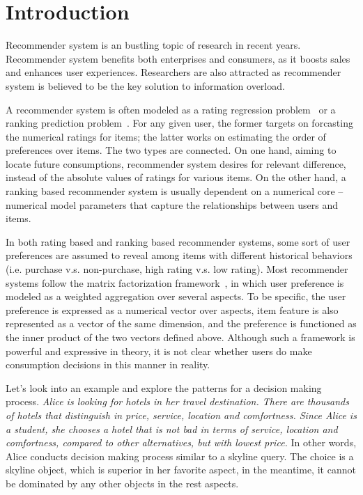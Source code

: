 \documentclass{sig-alternate}
\begin{document}
\section{Introduction}\label{sec:introduction}
Recommender system is an bustling topic of research in recent years. Recommender system benefits both enterprises and consumers, as it boosts sales and enhances user experiences. Researchers are also attracted as recommender system is believed to be the key solution to information overload.   
  
A recommender system is often modeled as a rating regression problem~\cite{Bobadilla2013Recommender} or a ranking prediction problem~\cite{Rendle2009BPR}. For any given user, the former targets on forcasting the numerical ratings for items; the latter works on estimating the order of preferences over items. The two types are connected. On one hand, aiming to locate future consumptions, recommender system desires for relevant difference, instead of the absolute values of ratings for various items. On the other hand, a ranking based recommender system is usually dependent on a numerical core -- numerical model parameters that capture the relationships between users and items.         

In both rating based and ranking based recommender systems, some sort of user preferences are assumed to reveal among items with different historical behaviors (i.e. purchase v.s. non-purchase, high rating v.s. low rating). Most recommender systems follow the matrix factorization framework~\cite{Koren2009Matrix}, in which user preference is modeled as a weighted aggregation over several aspects. To be specific, the user preference is expressed as a numerical vector over aspects, item feature is also represented as a vector of the same dimension, and the preference is functioned as the inner product of the two vectors defined above. Although such a framework is powerful and expressive in theory, it is not clear whether users do make consumption decisions in this manner in reality.  

Let's look into an example and explore the patterns for a decision making process. \textit{Alice is looking for hotels in her travel destination. There are thousands of hotels that distinguish in price, service, location and comfortness. Since Alice is a student, she chooses a hotel that is not bad in terms of service, location and comfortness, compared to other alternatives, but with lowest price.} In other words, Alice conducts decision making process similar to a skyline query. The choice is a skyline object, which is superior in her favorite aspect, in the meantime, it cannot be dominated by any other objects in the rest aspects. 
\end{document}
